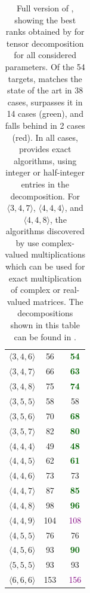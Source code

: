 \begin{table}[h]
\begin{center}
{\begin{tabular}{ccc}
    $\langle 3, 4, 6 \rangle$ & 56~\citep{Kauers_2025} & \textcolor{darkgreen}{\textbf{54}} \\ 
    $\langle 3, 4, 7 \rangle$ & 66~\citep{smirnov2021} & \textcolor{darkgreen}{\textbf{63}} \\ 
    $\langle 3, 4, 8 \rangle$ & 75~\citep{smirnov2021}   & \textcolor{darkgreen}{\textbf{74}} \\ 
    $\langle 3, 5, 5 \rangle$ & 58~\citep{smirnov2021} & 58 \\ 
    $\langle 3, 5, 6 \rangle$ & 70~\citep{Kauers_2025} & \textcolor{darkgreen}{\textbf{68}} \\
    $\langle 3, 5, 7 \rangle$ & 82~\citep{smirnov2021} & \textcolor{darkgreen}{\textbf{80}} \\ 
    $\langle 4, 4, 4 \rangle$ & 49~\citep{strassen1969gaussian} & \textcolor{darkgreen}{\textbf{48}}  \\ 
    $\langle 4, 4, 5 \rangle$ & 62~\citep{kauers2023flip}   & \textcolor{darkgreen}{\textbf{61}}    \\
    $\langle 4, 4, 6 \rangle$ & 73~\citep{Kauers_2025} & 73 \\ 
    $\langle 4, 4, 7 \rangle$ & 87~\citep{smirnov2013bilinear,strassen1969gaussian} & \textcolor{darkgreen}{\textbf{85}}    \\
    $\langle 4, 4, 8 \rangle$ & 98~\citep{strassen1969gaussian} & \textcolor{darkgreen}{\textbf{96}} \\ 
    $\langle 4, 4, 9 \rangle$ & 104~\citep{smirnov2022} & \textcolor{purple}{108} \\ 
    $\langle 4, 5, 5 \rangle$ & 76~\citep{fawzi2022discovering} & 76 \\ 
    $\langle 4, 5, 6 \rangle$ & 93~\citep{Kauers_2025}   & \textcolor{darkgreen}{\textbf{90}} \\ 
    $\langle 5, 5, 5 \rangle$ & 93~\citep{flip_graphs_with_symmetry} & 93 \\ 
    $\langle 6, 6, 6 \rangle$ & 153~\citep{flip_graphs_with_symmetry} & \textcolor{purple}{156} \\ 
    \end{tabular}
    }
\caption{Full version of , showing the best ranks obtained by \method for tensor decomposition for all considered parameters. Of the 54 targets, \method matches the state of the art in 38 cases, surpasses it in 14 cases (green), and falls behind in 2 cases (red). In all cases, \method provides exact algorithms, using integer or half-integer entries in the decomposition. For $\langle 3, 4, 7\rangle$, $\langle 4, 4, 4\rangle$, and $\langle 4, 4, 8\rangle$, the algorithms discovered by \method use complex-valued multiplications which can be used for exact multiplication of complex or real-valued matrices. The decompositions shown in this table can be found in \ResultsColab.}
    \label{tab:relaxed-opt-results-appendix}
\end{center}
\end{table}

